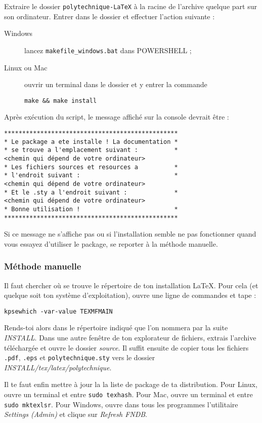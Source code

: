 \documentclass[a4paper,12pt,twoside]{article}
\begin{document}
Extraire le dossier \texttt{polytechnique-LaTeX} à la racine de l'archive quelque part sur son ordinateur. Entrer dans le dossier et effectuer l'action suivante :
\begin{description}
\item[Windows] lancez \texttt{makefile\_windows.bat} dans POWERSHELL ;
\item[Linux ou Mac] ouvrir un terminal dans le dossier et y entrer la commande
\begin{verbatim}
make && make install
\end{verbatim}
\end{description}
Après exécution du script, le message affiché sur la console devrait être :
\begin{verbatim}
************************************************
* Le package a ete installe ! La documentation *
* se trouve a l'emplacement suivant :          *
<chemin qui dépend de votre ordinateur>
* Les fichiers sources et resources a          *
* l'endroit suivant :                          *
<chemin qui dépend de votre ordinateur>
* Et le .sty a l'endroit suivant :             *
<chemin qui dépend de votre ordinateur>
* Bonne utilisation !                          *
************************************************
\end{verbatim}

Si ce message ne s'affiche pas ou si l'installation semble ne pas fonctionner quand vous essayez d'utiliser le package, se reporter à la méthode manuelle.
\subsubsection{Méthode manuelle}

Il faut chercher où se trouve le répertoire de ton installation LaTeX. Pour cela (et quelque soit ton système d'exploitation), ouvre une ligne de commandes et tape :
\begin{verbatim}
kpsewhich -var-value TEXMFMAIN
\end{verbatim}
Rends-toi alors dans le répertoire indiqué que l'on nommera par la suite \emph{INSTALL}. Dans une autre fenêtre de ton explorateur de fichiers, extrais l'archive téléchargée et ouvre le dossier \emph{source}. Il suffit ensuite de copier tous les fichiers \texttt{.pdf}, \texttt{.eps} et \texttt{polytechnique.sty} vers le dossier \emph{INSTALL/tex/latex/polytechnique}. 

Il te faut enfin mettre à jour la la liste de package de ta distribution. Pour Linux, ouvre un terminal et entre \texttt{sudo texhash}. Pour Mac, ouvre un terminal et entre \texttt{sudo mktexlsr}. Pour Windows, ouvre dans tous les programmes l'utilitaire \emph{Settings (Admin)} et clique sur \emph{Refresh FNDB}.
\end{document}
